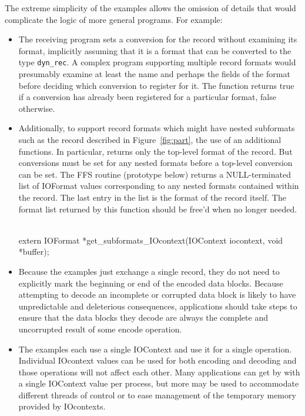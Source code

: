 The extreme simplicity of the examples allows the omission of details that
would complicate the logic of more general programs.  For example:
\begin{itemize}
\item The receiving program sets a conversion for the record without examining
its format, implicitly assuming that it is a format that can be converted to
the type {\tt dyn\_rec}.  A complex program supporting multiple record
formats would presumably examine at least the name and perhaps the fields of
the format before deciding which conversion to register for it.  The function
 returns true if a
conversion has already been registered for a particular format, false
otherwise. 
\item Additionally, to support record formats which might have nested
subformats such as the record described in Figure~\ref{fig:part}, the use of
an additional functions.  In particular, 
returns only the top-level format of the record.  But conversions must be set
for any nested formats before a top-level conversion can be set.  The FFS
routine  (prototype below) returns a
NULL-terminated list of IOFormat values corresponding to any nested formats
contained within the record.  The last entry in the list is the format of the
record itself.  The format list returned by this function should be free'd
when no longer needed.
\ \begin{Code}
extern IOFormat *get_subformats_IOcontext(IOContext iocontext, void *buffer);
\end{Code}

\item Because the examples just exchange a single record, they do not need to
explicitly mark the beginning or end of the encoded data blocks.  Because
attempting to decode an incomplete or corrupted data block is likely to have
unpredictable and deleterious consequences, applications should take steps to
ensure that the data blocks they decode are always the complete and
uncorrupted result of some encode operation.
\item The examples each use a single IOContext and use it for a single
operation.  Individual IOcontext values can be used for both encoding and
decoding and those operations will not affect each other.  Many applications
can get by with a single IOContext value per process, but more may be used to
accommodate different threads of control or to ease management of the temporary
memory provided by IOcontexts.
\end{itemize}

